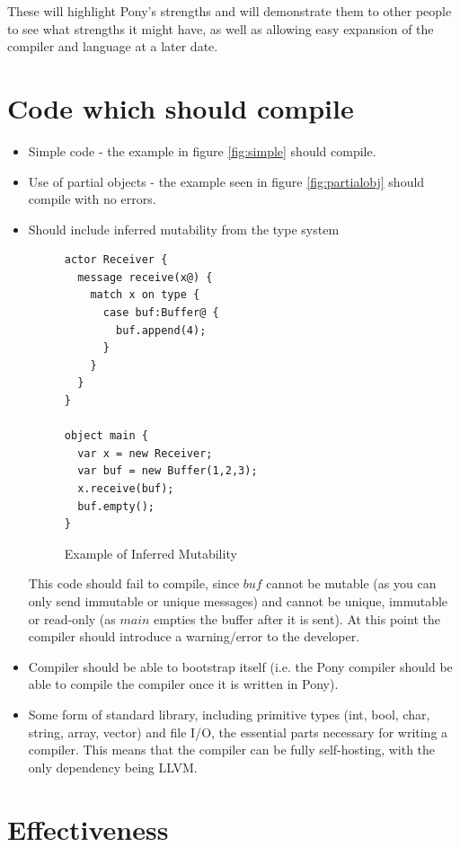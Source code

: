 \documentclass[11pt,a4paper]{report}
\begin{document}
These will highlight Pony's strengths and will demonstrate them to other people to see what strengths it might have, as well as allowing easy expansion of the compiler and language at a later date.

\section{Code which should compile}

\begin{itemize}

\item Simple code - the example in figure \ref{fig:simple} should compile.
\item Use of partial objects - the example seen in figure \ref{fig:partialobj} should compile with no errors.

\item Should include inferred mutability from the type system

\begin{figure}[H]
\begin{verbatim}
actor Receiver {
  message receive(x@) {
    match x on type {
      case buf:Buffer@ {
        buf.append(4);
      }
    }
  }
}

object main {
  var x = new Receiver;
  var buf = new Buffer(1,2,3);
  x.receive(buf);
  buf.empty();
}
\end{verbatim}
\caption{Example of Inferred Mutability}
\end{figure}

This code should fail to compile, since $buf$ cannot be mutable (as you can only send immutable or unique messages) and cannot be unique, immutable or read-only (as $main$ empties the buffer after it is sent).
At this point the compiler should introduce a warning/error to the developer.

\item Compiler should be able to bootstrap itself (i.e. the Pony compiler should be able to compile the compiler once it is written in Pony).

\item Some form of standard library, including primitive types (int, bool, char, string, array, vector) and file I/O, the essential parts necessary for writing a compiler.
	This means that the compiler can be fully self-hosting, with the only dependency being LLVM.
\end{itemize}

\section{Effectiveness}
\end{document}
